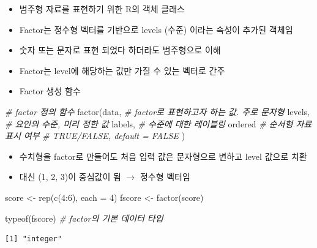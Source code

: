 \documentclass[
  11pt,
]{krantz}
\newenvironment{Shaded}{\begin{snugshade}}{\end{snugshade}}
\newcommand{\AttributeTok}[1]{\textcolor[rgb]{0.61,0.61,0.61}{#1}}
\newcommand{\CommentTok}[1]{\textcolor[rgb]{0.37,0.37,0.37}{\textit{#1}}}
\newcommand{\DecValTok}[1]{\textcolor[rgb]{0.06,0.06,0.06}{#1}}
\newcommand{\FunctionTok}[1]{\textcolor[rgb]{0,0,0}{#1}}
\newcommand{\NormalTok}[1]{#1}
\newcommand{\OtherTok}[1]{\textcolor[rgb]{0.37,0.37,0.37}{#1}}
\newcommand{\SpecialCharTok}[1]{\textcolor[rgb]{0,0,0}{#1}}
\providecommand{\tightlist}{%
  \setlength{\itemsep}{0pt}\setlength{\parskip}{0pt}}
\begin{document}
\begin{itemize}
\tightlist
\item
  범주형 자료를 표현하기 위한 R의 객체 클래스
\item
  Factor는 정수형 벡터를 기반으로 levels (수준) 이라는 속성이 추가된 객체임
\item
  숫자 또는 문자로 표현 되었다 하더라도 범주형으로 이해
\item
  Factor는 level에 해당하는 값만 가질 수 있는 벡터로 간주
\item
  Factor 생성 함수
\end{itemize}

\footnotesize

\begin{Shaded}
\begin{Highlighting}[]
\CommentTok{\# factor 정의 함수}
\FunctionTok{factor}\NormalTok{(data, }\CommentTok{\# factor로 표현하고자 하는 값. 주로 문자형}
\NormalTok{       levels, }\CommentTok{\# 요인의 수준, 미리 정한 값}
\NormalTok{       labels, }\CommentTok{\# 수준에 대한 레이블링}
\NormalTok{       ordered }\CommentTok{\# 순서형 자료 표시 여부}
               \CommentTok{\# TRUE/FALSE, default = FALSE}
\NormalTok{       )}
\end{Highlighting}
\end{Shaded}

\normalsize

\begin{itemize}
\tightlist
\item
  수치형을 factor로 만들어도 처음 입력 값은 문자형으로 변하고 level 값으로 치환
\item
  대신 (1, 2, 3)이 중심값이 됨 \(\rightarrow\) 정수형 벡터임
\end{itemize}

\footnotesize

\begin{Shaded}
\begin{Highlighting}[]
\NormalTok{score }\OtherTok{\textless{}{-}} \FunctionTok{rep}\NormalTok{(}\FunctionTok{c}\NormalTok{(}\DecValTok{4}\SpecialCharTok{:}\DecValTok{6}\NormalTok{), }\AttributeTok{each =} \DecValTok{4}\NormalTok{)}
\NormalTok{fscore }\OtherTok{\textless{}{-}} \FunctionTok{factor}\NormalTok{(score)}

\FunctionTok{typeof}\NormalTok{(fscore) }\CommentTok{\# factor의 기본 데이터 타입}
\end{Highlighting}
\end{Shaded}

\begin{verbatim}
[1] "integer"
\end{verbatim}
\end{document}
